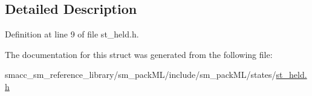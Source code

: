 \subsection{Detailed Description}


Definition at line 9 of file st\+\_\+held.\+h.



The documentation for this struct was generated from the following file\+:\begin{DoxyCompactItemize}
\item 
smacc\+\_\+sm\+\_\+reference\+\_\+library/sm\+\_\+pack\+M\+L/include/sm\+\_\+pack\+M\+L/states/\hyperlink{st__held_8h}{st\+\_\+held.\+h}\end{DoxyCompactItemize}
